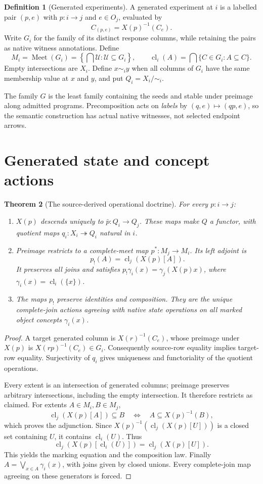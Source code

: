 \documentclass[11pt]{article}
\newtheorem{theorem}{Theorem}[section]
\theoremstyle{definition}\newtheorem{definition}[theorem]{Definition}
\theoremstyle{remark}\newtheorem{remark}[theorem]{Remark}
\newcommand{\Meet}{\operatorname{Meet}}
\newcommand{\cl}{\operatorname{cl}}
\begin{document}
\begin{definition}[Generated experiments]
A generated experiment at $i$ is a labelled pair $(p,e)$ with
$p:i\to j$ and $e\in O_j$, evaluated by
\[
 C_{(p,e)}=X(p)^{-1}(C_e).
\]
Write $G_i$ for the family of its distinct response columns, while
retaining the pairs as native witness annotations. Define
\[
 M_i=\Meet(G_i)
 =\left\{\bigcap\mathcal U:\mathcal U\subseteq G_i\right\},
 \qquad
 \cl_i(A)=\bigcap\{C\in G_i:A\subseteq C\}.
\]
Empty intersections are $X_i$. Define $x\sim_i y$ when all columns of
$G_i$ have the same membership value at $x$ and $y$, and put
$Q_i=X_i/{\sim_i}$.
\end{definition}
The family $G$ is the least family containing the seeds and stable
under preimage along admitted programs. Precomposition acts on
\emph{labels} by $(q,e)\mapsto(qp,e)$, so the semantic construction has
actual native witnesses, not selected endpoint arrows.

\section{Generated state and concept actions}
\begin{theorem}[The source-derived operational doctrine]
For every $p:i\to j$:
\begin{enumerate}
\item $X(p)$ descends uniquely to $\bar p:Q_i\to Q_j$. These maps
make $Q$ a functor, with quotient maps $q_i:X_i\twoheadrightarrow Q_i$
natural in $i$.
\item Preimage restricts to a complete-meet map
$p^*:M_j\to M_i$. Its left adjoint is
\[
 p_!(A)=\cl_j(X(p)[A]).
\]
It preserves all joins and satisfies
$p_!\gamma_i(x)=\gamma_j(X(p)x)$, where
$\gamma_i(x)=\cl_i(\{x\})$.
\item The maps $p_!$ preserve identities and composition. They are the
unique complete-join actions agreeing with native state operations on
all marked object concepts $\gamma_i(x)$.
\end{enumerate}
\end{theorem}
\begin{proof}
A target generated column is $X(r)^{-1}(C_e)$, whose preimage under
$X(p)$ is $X(rp)^{-1}(C_e)\in G_i$. Consequently source-row equality
implies target-row equality. Surjectivity of $q_i$ gives uniqueness and
functoriality of the quotient operations.

Every extent is an intersection of generated columns; preimage preserves
arbitrary intersections, including the empty intersection. It therefore
restricts as claimed. For extents $A\in M_i,B\in M_j$,
\[
 \cl_j(X(p)[A])\subseteq B
 \quad\Longleftrightarrow\quad
 A\subseteq X(p)^{-1}(B),
\]
which proves the adjunction. Since $X(p)^{-1}(\cl_j(X(p)[U]))$ is a
closed set containing $U$, it contains $\cl_i(U)$. Thus
\begin{equation}
 \cl_j(X(p)[\cl_i(U)])=\cl_j(X(p)[U]).\tag{CN}
\end{equation}
This yields the marking equation and the composition law.
Finally $A=\bigvee_{x\in A}\gamma_i(x)$, with joins given by closed
unions. Every complete-join map agreeing on these generators is forced.
\end{proof}
\end{document}
